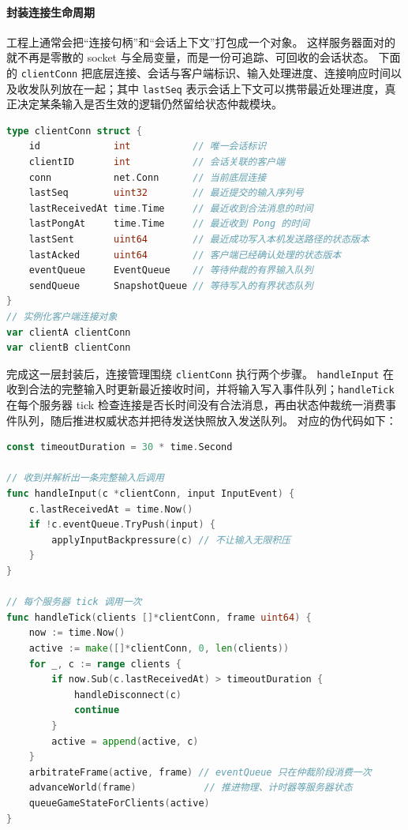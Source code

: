 \paragraph{封装连接生命周期}
工程上通常会把“连接句柄”和“会话上下文”打包成一个对象。
这样服务器面对的就不再是零散的 socket 与全局变量，而是一份可追踪、可回收的会话状态。
下面的 \texttt{clientConn} 把底层连接、会话与客户端标识、输入处理进度、连接响应时间以及收发队列放在一起；其中 \texttt{lastSeq} 表示会话上下文可以携带最近处理进度，真正决定某条输入是否生效的逻辑仍然留给状态仲裁模块。

\begin{tcolorbox}[title=连接管理的结构体定义]
\begin{lstlisting}[style=codeblock, language=go]
type clientConn struct {
    id             int           // 唯一会话标识
    clientID       int           // 会话关联的客户端
    conn           net.Conn      // 当前底层连接
    lastSeq        uint32        // 最近提交的输入序列号
    lastReceivedAt time.Time     // 最近收到合法消息的时间
    lastPongAt     time.Time     // 最近收到 Pong 的时间
    lastSent       uint64        // 最近成功写入本机发送路径的状态版本
    lastAcked      uint64        // 客户端已经确认处理的状态版本
    eventQueue     EventQueue    // 等待仲裁的有界输入队列
    sendQueue      SnapshotQueue // 等待写入的有界状态队列
}
// 实例化客户端连接对象
var clientA clientConn
var clientB clientConn
\end{lstlisting}
\end{tcolorbox}

完成这一层封装后，连接管理围绕 \texttt{clientConn} 执行两个步骤。
\texttt{handleInput} 在收到合法的完整输入时更新最近接收时间，并将输入写入事件队列；\texttt{handleTick} 在每个服务器 tick 检查连接是否长时间没有合法消息，再由状态仲裁统一消费事件队列，随后推进权威状态并把待发送快照放入发送队列。
对应的伪代码如下：

\begin{tcolorbox}[title=连接管理伪代码示例]
\begin{lstlisting}[style=codeblock, language=go]
const timeoutDuration = 30 * time.Second

// 收到并解析出一条完整输入后调用
func handleInput(c *clientConn, input InputEvent) {
    c.lastReceivedAt = time.Now()
    if !c.eventQueue.TryPush(input) {
        applyInputBackpressure(c) // 不让输入无限积压
    }
}

// 每个服务器 tick 调用一次
func handleTick(clients []*clientConn, frame uint64) {
    now := time.Now()
    active := make([]*clientConn, 0, len(clients))
    for _, c := range clients {
        if now.Sub(c.lastReceivedAt) > timeoutDuration {
            handleDisconnect(c)
            continue
        }
        active = append(active, c)
    }
    arbitrateFrame(active, frame) // eventQueue 只在仲裁阶段消费一次
    advanceWorld(frame)            // 推进物理、计时器等服务器状态
    queueGameStateForClients(active)
}
\end{lstlisting}
\end{tcolorbox}

